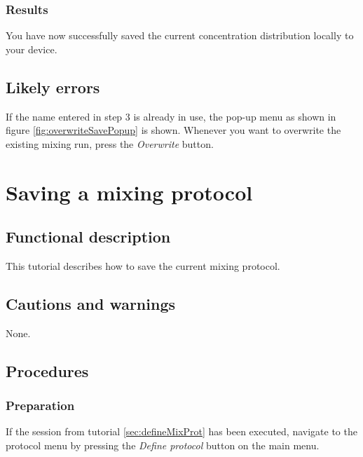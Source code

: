 \subsubsection{Results}
You have now successfully saved the current concentration distribution locally to your device.

\subsection{Likely errors}
If the name entered in step 3 is already in use, the pop-up menu as shown in figure \ref{fig:overwriteSavePopup} is shown. Whenever you want to overwrite the existing mixing run, press the \emph{Overwrite} button.



\section{Saving a mixing protocol}\label{sec:savmixprot}

\subsection{Functional description}
This tutorial describes how to save the current mixing protocol.

\subsection{Cautions and warnings}
None.

\subsection{Procedures}

\subsubsection{Preparation}
If the session from tutorial \ref{sec:defineMixProt} has been executed, navigate to the protocol menu by pressing the \emph{Define protocol} button on the main menu.

